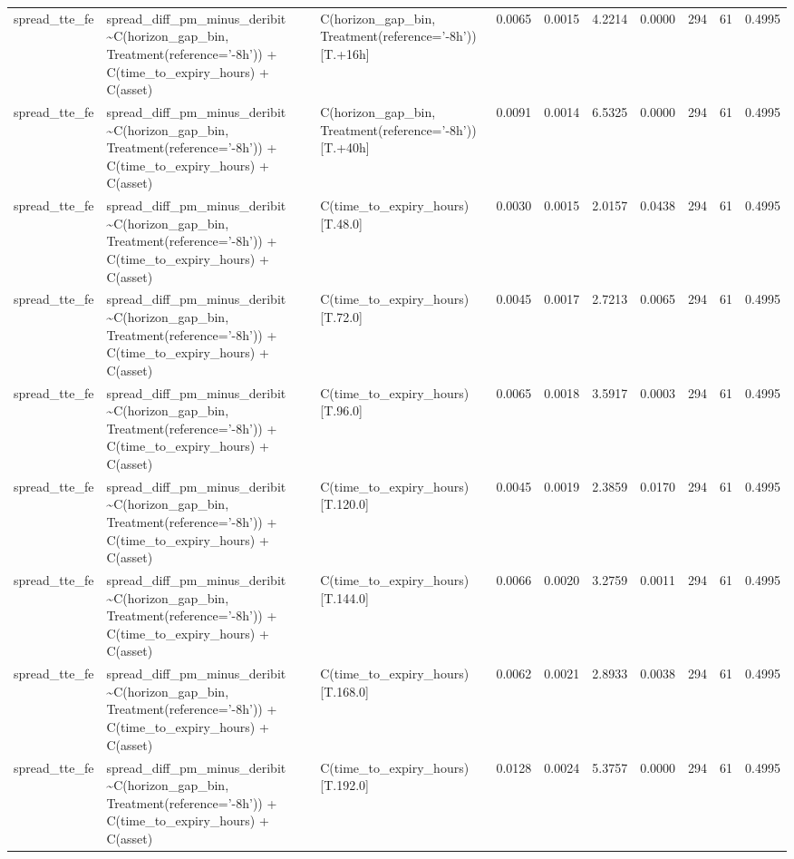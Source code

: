 \begin{table}
\begin{tabular}{lllrrrrrrr}
spread\_tte\_fe & spread\_diff\_pm\_minus\_deribit \textasciitilde \space C(horizon\_gap\_bin, Treatment(reference='-8h')) + C(time\_to\_expiry\_hours) + C(asset) & C(horizon\_gap\_bin, Treatment(reference='-8h'))[T.+16h] & 0.0065 & 0.0015 & 4.2214 & 0.0000 & 294 & 61 & 0.4995 \\
spread\_tte\_fe & spread\_diff\_pm\_minus\_deribit \textasciitilde \space C(horizon\_gap\_bin, Treatment(reference='-8h')) + C(time\_to\_expiry\_hours) + C(asset) & C(horizon\_gap\_bin, Treatment(reference='-8h'))[T.+40h] & 0.0091 & 0.0014 & 6.5325 & 0.0000 & 294 & 61 & 0.4995 \\
spread\_tte\_fe & spread\_diff\_pm\_minus\_deribit \textasciitilde \space C(horizon\_gap\_bin, Treatment(reference='-8h')) + C(time\_to\_expiry\_hours) + C(asset) & C(time\_to\_expiry\_hours)[T.48.0] & 0.0030 & 0.0015 & 2.0157 & 0.0438 & 294 & 61 & 0.4995 \\
spread\_tte\_fe & spread\_diff\_pm\_minus\_deribit \textasciitilde \space C(horizon\_gap\_bin, Treatment(reference='-8h')) + C(time\_to\_expiry\_hours) + C(asset) & C(time\_to\_expiry\_hours)[T.72.0] & 0.0045 & 0.0017 & 2.7213 & 0.0065 & 294 & 61 & 0.4995 \\
spread\_tte\_fe & spread\_diff\_pm\_minus\_deribit \textasciitilde \space C(horizon\_gap\_bin, Treatment(reference='-8h')) + C(time\_to\_expiry\_hours) + C(asset) & C(time\_to\_expiry\_hours)[T.96.0] & 0.0065 & 0.0018 & 3.5917 & 0.0003 & 294 & 61 & 0.4995 \\
spread\_tte\_fe & spread\_diff\_pm\_minus\_deribit \textasciitilde \space C(horizon\_gap\_bin, Treatment(reference='-8h')) + C(time\_to\_expiry\_hours) + C(asset) & C(time\_to\_expiry\_hours)[T.120.0] & 0.0045 & 0.0019 & 2.3859 & 0.0170 & 294 & 61 & 0.4995 \\
spread\_tte\_fe & spread\_diff\_pm\_minus\_deribit \textasciitilde \space C(horizon\_gap\_bin, Treatment(reference='-8h')) + C(time\_to\_expiry\_hours) + C(asset) & C(time\_to\_expiry\_hours)[T.144.0] & 0.0066 & 0.0020 & 3.2759 & 0.0011 & 294 & 61 & 0.4995 \\
spread\_tte\_fe & spread\_diff\_pm\_minus\_deribit \textasciitilde \space C(horizon\_gap\_bin, Treatment(reference='-8h')) + C(time\_to\_expiry\_hours) + C(asset) & C(time\_to\_expiry\_hours)[T.168.0] & 0.0062 & 0.0021 & 2.8933 & 0.0038 & 294 & 61 & 0.4995 \\
spread\_tte\_fe & spread\_diff\_pm\_minus\_deribit \textasciitilde \space C(horizon\_gap\_bin, Treatment(reference='-8h')) + C(time\_to\_expiry\_hours) + C(asset) & C(time\_to\_expiry\_hours)[T.192.0] & 0.0128 & 0.0024 & 5.3757 & 0.0000 & 294 & 61 & 0.4995 \\

\end{tabular}
\end{table}

